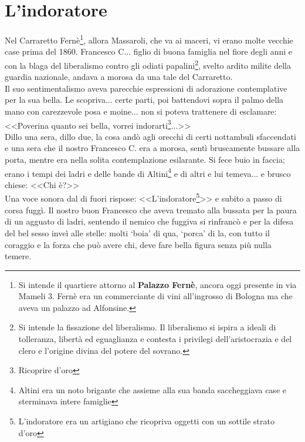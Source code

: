 
\chapter{L'indoratore}
Nel Carraretto Fernè\footnote{Si intende il quartiere attorno al \textbf{Palazzo Fernè}, ancora oggi presente in via Mameli 3. Fernè era un commerciante di vini all'ingrosso di Bologna ma che aveva un palazzo ad Alfonsine. }, allora Massaroli, che va ai maceri, vi erano molte vecchie case prima del 1860. Francesco C... figlio di buona famiglia nel fiore degli anni e con la blaga del liberalismo contro gli odiati papalini\footnote{Si intende la fissazione del liberalismo. Il liberalismo si ispira a ideali di tolleranza, libertà ed eguaglianza e contesta i privilegi dell'aristocrazia e del clero e l'origine divina del potere del sovrano.}, svelto ardito milite della guardia nazionale, andava a morosa da una tale del Carraretto. \\
Il suo sentimentalismo aveva parecchie espressioni di adorazione contemplative per la sua bella.
Le scopriva... certe parti, poi battendovi sopra il palmo della mano con carezzevole posa e moine... non si poteva trattenere di esclamare:\\
\indent <<Poverina quanto sei bella, vorrei indorarti\footnote{Ricoprire d'oro}...>>\\
Dillo una sera, dillo due, la cosa andò agli orecchi di certi nottambuli sfaccendati e una sera che il nostro Francesco C. era a morosa, sentì bruscamente bussare alla porta, mentre era nella solita contemplazione esilarante.
Si fece buio in faccia; erano i tempi dei ladri e delle bande di Altini\footnote{Altini era un noto brigante che assieme alla sua banda saccheggiava case e sterminava intere famiglie} e di altri e lui temeva... e brusco chiese: <<Chi è?>>\\
Una voce sonora dal di fuori rispose: <<L'indoratore\footnote{L'indoratore era un artigiano che ricopriva oggetti con un sottile strato d'oro}>> e subito a passo di corsa fuggì.
Il nostro buon Francesco che aveva tremato alla bussata per la paura di un agguato di ladri, sentendo il nemico che fuggiva si rinfrancò e per la difesa del bel sesso inveì alle stelle: molti ‘boia' di qua, ‘porca' di la, con tutto il coraggio e la forza che può avere chi, deve fare bella figura senza più nulla temere. 

